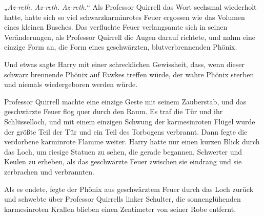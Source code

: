 „\emph{Az-reth. Az-reth. Az-reth.}“
Als Professor Quirrell das Wort sechsmal wiederholt hatte, hatte sich so viel schwarzkarminrotes Feuer ergossen wie das Volumen eines kleinen Busches. Das verfluchte Feuer verlangsamte sich in seinen Veränderungen, als Professor Quirrell die Augen darauf richtete, und nahm eine einzige Form an, die Form eines geschwärzten, blutverbrennenden Phönix.

Und etwas sagte Harry mit einer schrecklichen Gewissheit, dass, wenn dieser schwarz brennende Phönix auf Fawkes treffen würde, der wahre Phönix sterben und niemals wiedergeboren werden würde.

Professor Quirrell machte eine einzige Geste mit seinem Zauberstab, und das geschwärzte Feuer flog quer durch den Raum. Es traf die Tür und ihr Schlüsselloch, und mit einem einzigen Schwung der karmesinroten Flügel wurde der größte Teil der Tür und ein Teil des Torbogens verbrannt. Dann fegte die verdorbene karminrote Flamme weiter.
Harry hatte nur einen kurzen Blick durch das Loch, um riesige Statuen zu sehen, die gerade begannen, Schwerter und Keulen zu erheben, als das geschwärzte Feuer zwischen sie eindrang und sie zerbrachen und verbrannten.

Als es endete, fegte der Phönix aus geschwärztem Feuer durch das Loch zurück und schwebte über Professor Quirrells linker Schulter, die sonnenglühenden karmesinroten Krallen blieben einen Zentimeter von seiner Robe entfernt.

